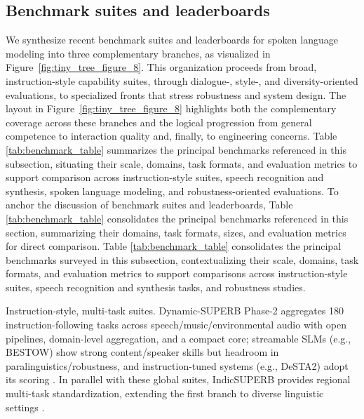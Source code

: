 \documentclass{article}
\begin{document}
\subsection{Benchmark suites and leaderboards} \label{subsec:benchmarksuitesandleaderboards}







We synthesize recent benchmark suites and leaderboards for spoken language modeling into three complementary branches, as visualized in Figure~\ref{fig:tiny_tree_figure_8}. This organization proceeds from broad, instruction-style capability suites, through dialogue-, style-, and diversity-oriented evaluations, to specialized fronts that stress robustness and system design. The layout in Figure~\ref{fig:tiny_tree_figure_8} highlights both the complementary coverage across these branches and the logical progression from general competence to interaction quality and, finally, to engineering concerns. Table \ref{tab:benchmark_table} summarizes the principal benchmarks referenced in this subsection, situating their scale, domains, task formats, and evaluation metrics to support comparison across instruction-style suites, speech recognition and synthesis, spoken language modeling, and robustness-oriented evaluations. To anchor the discussion of benchmark suites and leaderboards, Table \ref{tab:benchmark_table} consolidates the principal benchmarks referenced in this section, summarizing their domains, task formats, sizes, and evaluation metrics for direct comparison. Table \ref{tab:benchmark_table} consolidates the principal benchmarks surveyed in this subsection, contextualizing their scale, domains, task formats, and evaluation metrics to support comparisons across instruction-style suites, speech recognition and synthesis tasks, and robustness studies.

Instruction-style, multi-task suites. Dynamic-SUPERB Phase-2 aggregates 180 instruction-following tasks across speech/music/environmental audio with open pipelines, domain-level aggregation, and a compact core; streamable SLMs (e.g., BESTOW) show strong content/speaker skills but headroom in paralinguistics/robustness, and instruction-tuned systems (e.g., DeSTA2) adopt its scoring \cite{huang2025dynamicsuperbphase2collaborativelyexpand,chen2024bestowefficientstreamablespeechlanguagem,lu2025desta2developinginstructionfollowingspee}. In parallel with these global suites, IndicSUPERB provides regional multi-task standardization, extending the first branch to diverse linguistic settings \cite{entry2025indicsuperbspeechprocessinguniversalperf}.
\end{document}
